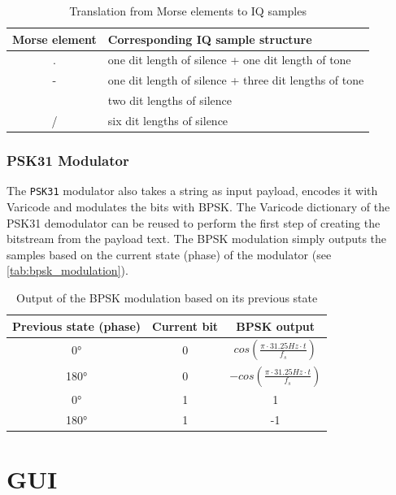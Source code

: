 \begin{table}
	\begin{center}
		\begin{tabular}{c l}
			Morse element & Corresponding IQ sample structure \\\hline
			. & one dit length of silence + one dit length of tone \\
			- & one dit length of silence + three dit lengths of tone \\
			\textvisiblespace & two dit lengths of silence \\
			/ & six dit lengths of silence \\\hline
		\end{tabular}
		\caption{Translation from Morse elements to IQ samples}
		\label{tab:morse_modulation}
	\end{center}
\end{table}


\subsubsection{PSK31 Modulator}

The \texttt{PSK31} modulator also takes a string as input payload, encodes it with
Varicode and modulates the bits with \ac{BPSK}. The Varicode dictionary of
the PSK31 demodulator can be reused to perform the first step of creating
the bitstream from the payload text. The \ac{BPSK} modulation simply outputs
the samples based on the current state (phase) of the modulator (see
\autoref{tab:bpsk_modulation}).

\begin{table}
	\begin{center}
		\begin{tabular}{c c | c}
			Previous state (phase) & Current bit & BPSK output \\\hline
			0° & 0 & $cos(\frac{\pi \cdot 31.25 Hz \cdot t}{f_s})$ \\
			180° & 0 & $-cos(\frac{\pi \cdot 31.25 Hz \cdot t}{f_s})$ \\
			0° & 1 & 1 \\
			180° & 1 & -1 \\\hline
		\end{tabular}
		\caption{Output of the BPSK modulation based on its previous state}
		\label{tab:bpsk_modulation}
	\end{center}
\end{table}



\section{GUI\label{sec:gui}}

